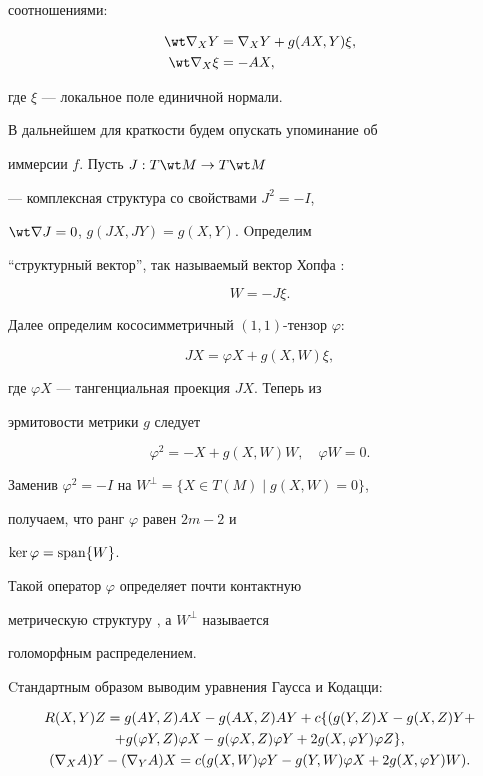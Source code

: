 соотношениями:


\begin{align}


\wt\nabla_XY&=\nabla_XY+g(AX,Y)\xi,\\


\wt\nabla_X\xi&=-AX,\notag


\end{align}


где $\xi$ --- локальное поле единичной нормали.





В дальнейшем для краткости будем опускать упоминание об


иммерсии $f$. Пусть $J:T\wt M\rightarrow T\wt M$


--- комплексная структура со свойствами $J^2=-I$,


$\wt \nabla J=0$, $g(JX,JY)=g(X,Y)$. Oпределим


``структурный вектор'', так называемый вектор Хопфа \cite{Berndt}:


$$


W=-J\xi.


$$


Далее определим кососимметричный $(1,1)$-тензор $\varphi$:


\begin{equation}


JX=\varphi X+g(X,W)\xi,


\end{equation}


где $\varphi X$ --- тангенциальная проекция $JX$. Теперь из


эрмитовости метрики $g$ следует


$$


\varphi^2=-X+g(X,W)W, \quad \varphi W=0.


$$


Заменив $\varphi^2=-I$ на $W^\perp=\{X\in T(M)\mid g(X,W)=0\}$,


получаем, что ранг $\varphi$ равен $2m-2$ и


$\ker \varphi=\operatorname{span}\{W\}$.


Такой оператор  $\varphi$ определяет почти контактную


метрическую структуру \cite{Blair}, а  $W^\perp$ называется


голоморфным распределением.


Cтандартным образом выводим уравнения Гаусса и Кодацци:


\begin{gather}


R(X,Y)Z=g(AY,Z)AX-g(AX,Z)AY +c\{( g(Y,Z)X-g(X,Z)Y+ \notag \\


+ g(\varphi Y,Z)\varphi X


-g(\varphi X,Z)\varphi Y +2 g(X,\varphi Y)\varphi Z\}, \\


(\nabla_X A)Y- (\nabla_Y A)X=c( g(X,W)\varphi Y-


g(Y,W)\varphi X+2g(X,\varphi Y)W).\notag


\end{gather}


